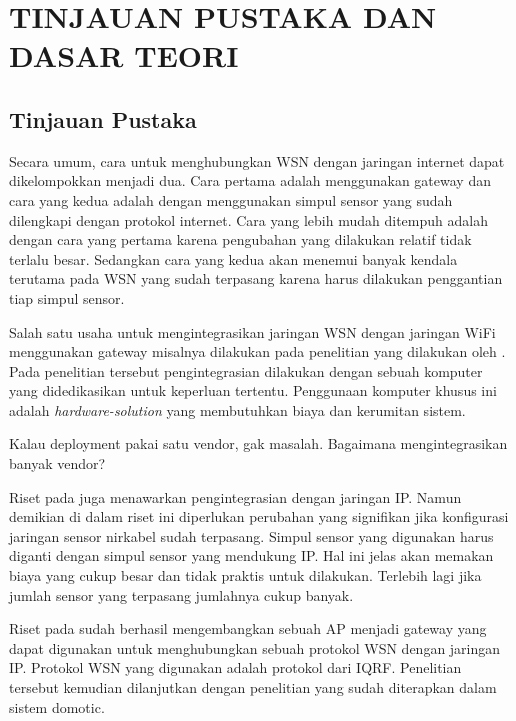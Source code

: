
\chapter{TINJAUAN PUSTAKA DAN DASAR TEORI}                

\section{Tinjauan Pustaka}
  Secara umum, cara untuk menghubungkan WSN dengan jaringan internet dapat dikelompokkan menjadi dua. Cara pertama adalah menggunakan gateway dan cara yang kedua adalah dengan menggunakan simpul sensor yang sudah dilengkapi dengan protokol internet. Cara yang lebih mudah ditempuh adalah dengan cara yang pertama karena pengubahan yang dilakukan relatif tidak terlalu besar. Sedangkan cara yang kedua akan menemui banyak kendala terutama pada WSN yang sudah terpasang karena harus dilakukan penggantian tiap simpul sensor.

  Salah satu usaha untuk mengintegrasikan jaringan WSN dengan jaringan WiFi menggunakan gateway misalnya dilakukan pada penelitian yang dilakukan oleh \cite{wibowo2013wireless}. Pada penelitian tersebut pengintegrasian dilakukan dengan sebuah komputer yang didedikasikan untuk keperluan tertentu. Penggunaan komputer khusus ini adalah \emph{hardware-solution} yang membutuhkan biaya dan kerumitan sistem.

  Kalau deployment pakai satu vendor, gak masalah. Bagaimana mengintegrasikan banyak vendor?

  Riset pada juga menawarkan pengintegrasian dengan jaringan IP. Namun demikian di dalam riset ini diperlukan perubahan yang signifikan jika konfigurasi jaringan sensor nirkabel sudah terpasang. Simpul sensor yang digunakan harus diganti dengan simpul sensor yang mendukung IP. Hal ini jelas akan memakan biaya yang cukup besar dan tidak praktis untuk dilakukan. Terlebih lagi jika jumlah sensor yang terpasang jumlahnya cukup banyak.

  Riset pada sudah berhasil mengembangkan sebuah AP menjadi gateway yang dapat digunakan untuk menghubungkan sebuah protokol WSN dengan jaringan IP. Protokol WSN yang digunakan adalah protokol dari IQRF. Penelitian tersebut kemudian dilanjutkan dengan penelitian yang sudah diterapkan dalam sistem domotic.

